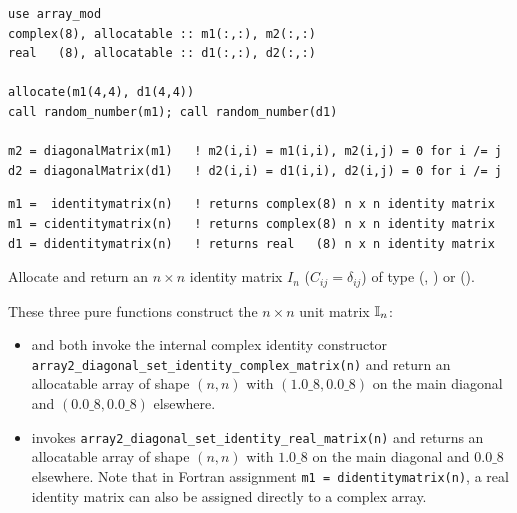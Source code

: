 \lstset{language=[95]Fortran}
\begin{lstlisting}
use array_mod
complex(8), allocatable :: m1(:,:), m2(:,:)
real   (8), allocatable :: d1(:,:), d2(:,:)

allocate(m1(4,4), d1(4,4))
call random_number(m1); call random_number(d1)

m2 = diagonalMatrix(m1)   ! m2(i,i) = m1(i,i), m2(i,j) = 0 for i /= j
d2 = diagonalMatrix(d1)   ! d2(i,i) = d1(i,i), d2(i,j) = 0 for i /= j
\end{lstlisting}


\lstset{language=[95]Fortran}
\begin{lstlisting}
m1 =  identitymatrix(n)   ! returns complex(8) n x n identity matrix
m1 = cidentitymatrix(n)   ! returns complex(8) n x n identity matrix
d1 = didentitymatrix(n)   ! returns real   (8) n x n identity matrix
\end{lstlisting}

Allocate and return an $n\times n$ identity matrix $I_n$ ($C_{ij} = \delta_{ij}$) of type  (, ) or  ().

These three pure functions construct the $n\times n$ unit matrix $\mathbb{I}_n$:
\begin{itemize}
  \item {} and  both invoke the internal complex identity constructor \texttt{array2\_diagonal\_set\_identity\_complex\_matrix(n)} and return an allocatable  array of shape $(n,n)$ with $(1.0\_8, 0.0\_8)$ on the main diagonal and $(0.0\_8, 0.0\_8)$ elsewhere.
  \item {} invokes \texttt{array2\_diagonal\_set\_identity\_real\_matrix(n)} and returns an allocatable  array of shape $(n,n)$ with $1.0\_8$ on the main diagonal and $0.0\_8$ elsewhere. Note that in Fortran assignment \texttt{m1 = didentitymatrix(n)}, a real identity matrix can also be assigned directly to a complex array.
\end{itemize}

